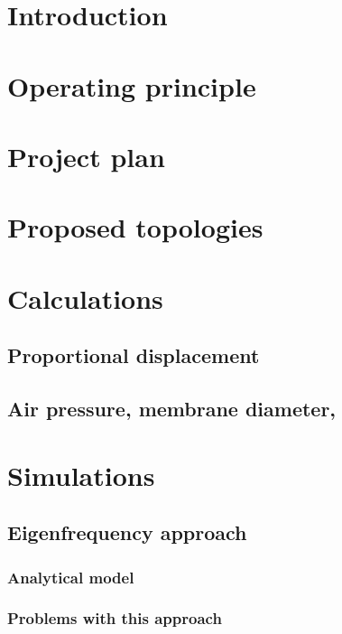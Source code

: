 \section*{Introduction} 



\section{Operating principle}


\section{Project plan}

\section{Proposed topologies}

\section{Calculations}
\subsection{Proportional displacement}

\subsection{Air pressure, membrane diameter, }

\section{Simulations}
\subsection{Eigenfrequency approach}
\subsubsection{Analytical model}
\subsubsection{Problems with this approach}

